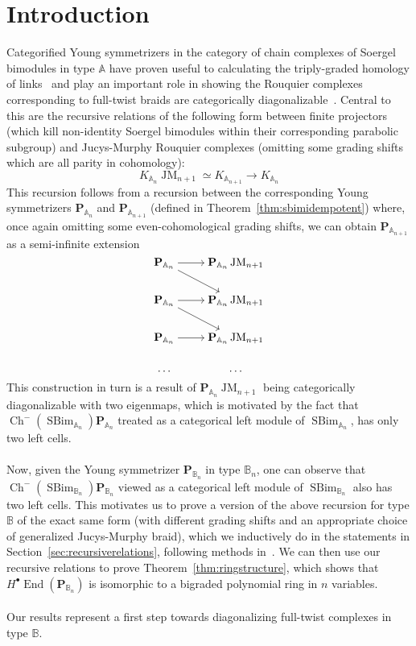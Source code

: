 \documentclass[11pt]{article}
\DeclareMathOperator{\End}{End}
\DeclareMathOperator{\Ch}{Ch}
\DeclareMathOperator{\SBim}{SBim}
\DeclareMathOperator{\JM}{JM}
\theoremstyle{definition}
\theoremstyle{remark}
\numberwithin{equation}{section}
\begin{document}
\section{Introduction}
\noindent Categorified Young symmetrizers
in the category of chain complexes of
Soergel bimodules in type $\mathbb{A}$
have proven useful to calculating the
triply-graded homology of
links~\cite{hogancamp_categorified_2018, abel_categorified_2016,
elias_computation_2019} and
play an important role in showing the Rouquier complexes corresponding to
full-twist braids are categorically diagonalizable~\cite{elias_categorical_2025}.
Central to this are the recursive relations 
of the following form between finite projectors (which kill
non-identity Soergel bimodules within their corresponding parabolic subgroup)
and Jucys-Murphy Rouquier complexes (omitting some grading shifts which are all
parity in cohomology):
\[K_{\mathbb{A}_n}\JM_{n+1} \simeq K_{\mathbb{A}_{n+1}} \to K_{\mathbb{A}_{n}}\]
This recursion follows from a recursion between the corresponding Young symmetrizers
$\mathbf{P}_{\mathbb{A}_n}$
and $\mathbf{P}_{\mathbb{A}_{n+1}}$ (defined in Theorem~\ref{thm:sbimidempotent})
where, once again
omitting some even-cohomological grading shifts, we can obtain
$\mathbf{P}_{\mathbb{A}_{n+1}}$ as a semi-infinite extension
\[\begin{tikzcd}[ampersand replacement=\&,cramped]
	{\mathbf{P}_{\mathbb{A}_{n}}} \& {\mathbf{P}_{\mathbb{A}_{n}}\JM_{n+1}} \\
	{\mathbf{P}_{\mathbb{A}_n}} \& {\mathbf{P}_{\mathbb{A}_n}\JM_{n+1}} \\
	{\mathbf{P}_{\mathbb{A}_n}} \& {\mathbf{P}_{\mathbb{A}_n}\JM_{n+1}} \\
	\dots \& \dots
	\arrow[from=1-1, to=1-2]
	\arrow[from=1-1, to=2-2]
	\arrow[from=2-1, to=2-2]
	\arrow[from=2-1, to=3-2]
	\arrow[from=3-1, to=3-2]
\end{tikzcd}\]
This construction in turn
is a result of $\mathbf{P}_{\mathbb{A}_n}\JM_{n+1}$ being categorically
diagonalizable with two eigenmaps, which is motivated by the fact that
$\Ch^-(\SBim_{\mathbb{A}_n})\mathbf{P}_{\mathbb{A}_n}$ treated as a categorical left module of
$\SBim_{\mathbb{A}_n}$, has only two left cells.
\\ \\
Now, given the Young symmetrizer
$\mathbf{P}_{\mathbb{B}_n}$ in type $\mathbb{B}_n$, one can observe that
$\Ch^-(\SBim_{\mathbb{B}_n})\mathbf{P}_{\mathbb{B}_n}$ viewed as a categorical left module of
$\SBim_{\mathbb{B}_n}$ also has two left cells. This motivates us to
prove a version of the above recursion for type $\mathbb{B}$ of
the exact same form (with different grading shifts and an appropriate
choice of generalized Jucys-Murphy braid), which we inductively do
in the statements in
Section~\ref{sec:recursiverelations}, following methods in~\cite{elias_categorical_2017, hogancamp_categorified_2018, abel_categorified_2016,elias_computation_2019}.
We can then use our recursive relations to prove Theorem~\ref{thm:ringstructure},
which shows that $H^\bullet\End(\mathbf{P}_{\mathbb{B}_n})$ is isomorphic to
a bigraded polynomial ring in $n$ variables.
\\ \\
Our results represent a first step towards diagonalizing full-twist complexes
in type $\mathbb{B}$.
\end{document}
